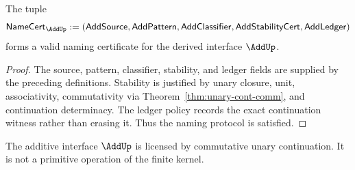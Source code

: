 \begin{theorem}
\label{thm:concrete-addup-namecert}
The tuple
$$
  \mathsf{NameCert}_{\AddUp}
  :=
  (\mathsf{AddSource},
   \mathsf{AddPattern},
   \mathsf{AddClassifier},
   \mathsf{AddStabilityCert},
   \mathsf{AddLedger})
$$
forms a valid naming certificate for the derived interface \(\AddUp\).
\end{theorem}
\begin{proof}
The source, pattern, classifier, stability, and ledger fields are supplied by the preceding definitions. Stability is justified by unary closure, unit, associativity, commutativity via Theorem~\ref{thm:unary-cont-comm}, and continuation determinacy. The ledger policy records the exact continuation witness rather than erasing it. Thus the naming protocol is satisfied.
\end{proof}

\begin{corollary}
The additive interface \(\AddUp\) is licensed by commutative unary continuation. It is not a primitive operation of the finite kernel.
\end{corollary}

